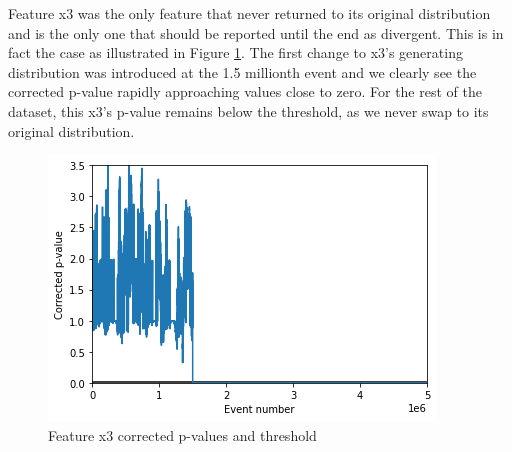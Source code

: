 Feature x3 was the only feature that never returned to its original distribution and is the only one that should be reported until the end as divergent. This is in fact the case as illustrated in Figure \ref{fig:x3-corrected-pvalues}. The first change to x3's generating distribution was introduced at the 1.5 millionth event and we clearly see the corrected p-value rapidly approaching values close to zero. For the rest of the dataset, this x3's p-value remains below the threshold, as we never swap to its original distribution.
\begin{figure}[!htb]
    \begin{center}
      \includegraphics[scale=0.8]{figures/x3-corrected-pvalues.png}
      \caption{Feature x3 corrected p-values and threshold}
      \label{fig:x3-corrected-pvalues}
    \end{center}
\end{figure}


